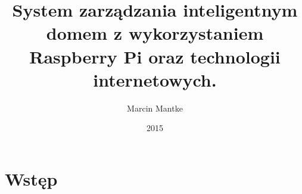 \documentclass[eng,oneside]{mgr}
\author{Marcin Mantke}
\title{System zarządzania inteligentnym domem z wykorzystaniem Raspberry Pi oraz technologii internetowych.}
\date{2015}
\begin{document}
\maketitle
\tableofcontents
\chapter{Wstęp}
\end{document}
